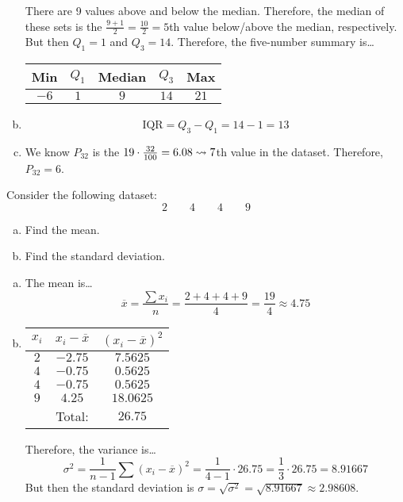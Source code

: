 \documentclass[12pt,letterpaper]{exam}
\begin{document}
\begin{questions}
\begin{enumerate}[(a)]
There are 9 values above and below the median. Therefore, the median of these sets is the $\frac{9 + 1}{2}= \frac{10}{2}= 5$th value below/above the median, respectively. But then $Q_1= 1$ and $Q_3= 14$. Therefore, the five-number summary is\dots \par
	\begin{table}[!ht]
	\centering
	\begin{tabular}{ccccc}
	Min & $Q_1$ & Median & $Q_3$ & Max \\ \hline
	$-6$ & $1$ & $9$ & $14$ & $21$
	\end{tabular}
	\end{table} \pspace

\item 
	\[
	\text{IQR}= Q_3 - Q_1= 14 - 1= 13
	\] \pspace

\item We know $P_{32}$ is the $19 \cdot \frac{32}{100}= 6.08 \rightsquigarrow 7$th value in the dataset. Therefore, $P_{32}= 6$. 
\end{enumerate}



\newpage
\question[10] Consider the following dataset:
	\[
	2 \qquad 4 \qquad 4 \qquad 9
	\]
	
\begin{enumerate}[(a)]
\item Find the mean. 
\item Find the standard deviation. 
\end{enumerate} \pspace

\sol 
\begin{enumerate}[(a)]
\item The mean is\dots
	\[
	\overline{x}= \dfrac{\sum x_i}{n}= \dfrac{2 + 4 + 4 + 9}{4}= \dfrac{19}{4} \approx 4.75
	\] \pspace

\item \phantom{.} \par
	\begin{table}[h]
	\centering
	\begin{tabular}{ccc}
	$x_i$ & $x_i - \overline{x}$ & $(x_i - \overline{x})^2$ \\ \hline
	$2$ & $-2.75$ & $7.5625$ \\
	$4$ & $-0.75$ & $0.5625$ \\
	$4$ & $-0.75$ & $0.5625$ \\
	$9$ & $4.25$ & $18.0625$ \\ \hline
	& Total: & $26.75$
	\end{tabular}
	\end{table} \par
Therefore, the variance is\dots
	\[
	\sigma^2= \dfrac{1}{n - 1} \sum (x_i - \overline{x})^2= \dfrac{1}{4 - 1} \cdot 26.75= \dfrac{1}{3} \cdot 26.75= 8.91667
	\]
But then the standard deviation is $\sigma= \sqrt{\sigma^2}= \sqrt{8.91667} \approx 2.98608$.
\end{enumerate}




\end{questions}
\end{document}
